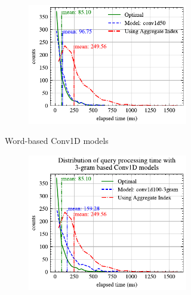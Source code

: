\begin{figure}[!h]
\begin{subfigure}{0.45\textwidth}
\begin{subfigure}{\textwidth}
			\includegraphics[]{my/graphics/perf_dist_conv1d50_A.pdf}
		\end{subfigure}
		\caption{Word-based Conv1D models}
	\end{subfigure}
	\hfill
	\begin{subfigure}{0.45\textwidth}
		\begin{subfigure}{\textwidth}
			\centering
			\includegraphics[]{my/graphics/perf_dist_conv1d100_3gram_A.pdf}
		\end{subfigure}
		\vfill
		\begin{subfigure}{\textwidth}
			\centering

\end{subfigure}
\end{subfigure}
\end{figure}
